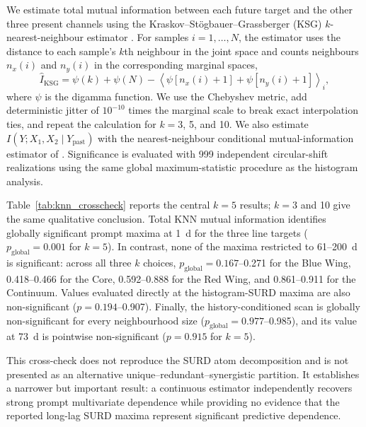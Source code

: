 \documentclass[fleqn,usenatbib]{mnras}
\begin{document}
We estimate total mutual information between each future target and the other three present channels using the Kraskov--St{\"o}gbauer--Grassberger (KSG) $k$-nearest-neighbour estimator \citep{Kraskov2004}. For samples $i=1,\ldots,N$, the estimator uses the distance to each sample's $k$th neighbour in the joint space and counts neighbours $n_x(i)$ and $n_y(i)$ in the corresponding marginal spaces,
\begin{equation}
\widehat I_{\mathrm{KSG}} = \psi(k)+\psi(N)-\left\langle\psi[n_x(i)+1]+\psi[n_y(i)+1]\right\rangle_i,
\end{equation}
where $\psi$ is the digamma function. We use the Chebyshev metric, add deterministic jitter of $10^{-10}$ times the marginal scale to break exact interpolation ties, and repeat the calculation for $k=3$, 5, and 10. We also estimate $I(Y;X_1,X_2\mid Y_{\mathrm{past}})$ with the nearest-neighbour conditional mutual-information estimator of \citet{FrenzelPompe2007}. Significance is evaluated with 999 independent circular-shift realizations using the same global maximum-statistic procedure as the histogram analysis.

Table~\ref{tab:knn_crosscheck} reports the central $k=5$ results; $k=3$ and 10 give the same qualitative conclusion. Total KNN mutual information identifies globally significant prompt maxima at 1~d for the three line targets ($p_{\mathrm{global}}=0.001$ for $k=5$). In contrast, none of the maxima restricted to 61--200~d is significant: across all three $k$ choices, $p_{\mathrm{global}}=0.167$--0.271 for the Blue Wing, 0.418--0.466 for the Core, 0.592--0.888 for the Red Wing, and 0.861--0.911 for the Continuum. Values evaluated directly at the histogram-SURD maxima are also non-significant ($p=0.194$--0.907). Finally, the history-conditioned scan is globally non-significant for every neighbourhood size ($p_{\mathrm{global}}=0.977$--0.985), and its value at 73~d is pointwise non-significant ($p=0.915$ for $k=5$).

This cross-check does not reproduce the SURD atom decomposition and is not presented as an alternative unique--redundant--synergistic partition. It establishes a narrower but important result: a continuous estimator independently recovers strong prompt multivariate dependence while providing no evidence that the reported long-lag SURD maxima represent significant predictive dependence.
\end{document}
